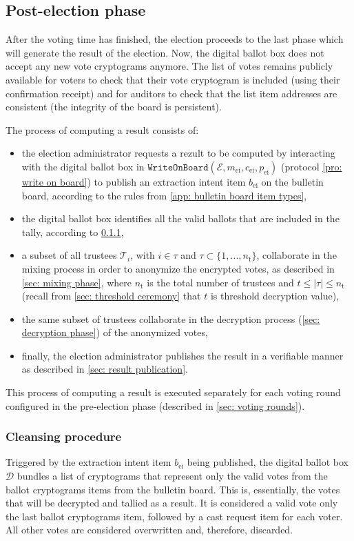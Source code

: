 \subsection{Post-election phase} \label{sec: post-election phase}
After the voting time has finished, the election proceeds to the last phase which will generate the result of the election. Now, the digital ballot box does not accept any new vote cryptograms anymore. The list of votes remains publicly available for voters to check that their vote cryptogram is included (using their confirmation receipt) and for auditors to check that the list item addresses are consistent (the integrity of the board is persistent).

The process of computing a result consists of:
\begin{itemize}
    \item the election administrator requests a rezult to be computed by interacting with the digital ballot box in $\mathtt{WriteOnBoard}(\mathcal{E}, m_\mathrm{ei}, c_\mathrm{ei}, p_\mathrm{ei})$ (protocol \ref{pro: write on board}) to publish an extraction intent item $b_\mathrm{ei}$ on the bulletin board, according to the rules from \cref{app: bulletin board item types},
    \item the digital ballot box identifies all the valid ballots that are included in the tally, according to \cref{sec: cleansing procedure},
    \item a subset of all trustees $\mathcal{T}_i$, with $i \in \tau$ and $\tau \subset \{ 1, ..., n_\mathrm{t} \}$, collaborate in the mixing process in order to anonymize the encrypted votes, as described in \cref{sec: mixing phase}, where $n_\mathrm{t}$ is the total number of trustees and $t \leq |\tau| \leq n_\mathrm{t}$ (recall from \cref{sec: threshold ceremony} that $t$ is threshold decryption value),
    \item the same subset of trustees collaborate in the decryption process (\cref{sec: decryption phase}) of the anonymized votes,
    \item finally, the election administrator publishes the result in a verifiable manner as described in \cref{sec: result publication}.
\end{itemize}

This process of computing a result is executed separately for each voting round configured in the pre-election phase (described in \cref{sec: voting rounds}).


\subsubsection{Cleansing procedure} \label{sec: cleansing procedure}
Triggered by the extraction intent item $b_\mathrm{ei}$ being published, the digital ballot box $\mathcal{D}$ bundles a list of cryptograms that represent only the valid votes from the ballot cryptograms items from the bulletin board. This is, essentially, the votes that will be decrypted and tallied as a result. It is considered a valid vote only the last ballot cryptograms item, followed by a cast request item for each voter. All other votes are considered overwritten and, therefore, discarded.

